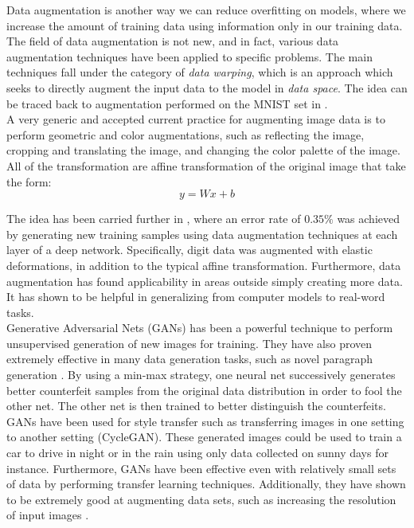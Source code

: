 \documentclass[10pt,twocolumn,letterpaper]{article}
\begin{document}
Data augmentation is another way we can reduce overfitting on models, where we increase the amount of training data using information only in our training data. The field of data augmentation is not new, and in fact, various data augmentation techniques have been applied to specific problems. The main techniques fall under the category of \textit{data warping}, which is an approach which seeks to directly augment the input data to the model in \textit{data space}. The idea can be traced back to augmentation performed on the MNIST set in \cite{original_image_model}.\\

A very generic and accepted current practice for augmenting image data is to perform geometric and color augmentations, such as reflecting the image, cropping and translating the image, and changing the color palette of the image. All of the transformation are affine transformation of the original image that take the form:
$$
y = Wx + b
$$


The idea has been carried further in \cite{handwriting_success_augmentation}, where an error rate of $0.35\%$ was achieved by generating new training samples using data augmentation techniques at each layer of a deep network. Specifically, digit data was augmented with elastic deformations, in addition to the typical affine transformation. Furthermore, data augmentation has found applicability in areas outside simply creating more data. It has shown to be helpful in generalizing from computer models to real-word tasks.\\

Generative Adversarial Nets (GANs) has been a powerful technique to perform unsupervised generation of new images for training. They have also proven extremely effective in many data generation tasks, such as novel paragraph generation \cite{paragraph_gan}. By using a min-max strategy, one neural net successively generates better counterfeit samples from the original data distribution in order to fool the other net. The other net is then trained to better distinguish the counterfeits. GANs have been used for style transfer such as transferring images in one setting to another setting (CycleGAN). These generated images could be used to train a car to drive in night or in the rain using only data collected on sunny days for instance. Furthermore, GANs have been effective even with relatively small sets of data \cite{gan_small_data} by performing transfer learning techniques. Additionally, they have shown to be extremely good at augmenting data sets, such as increasing the resolution of input images \cite{gan_augment}. \\
\end{document}
